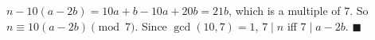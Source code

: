 $n-10(a-2b)=10a+b-10a+20b=21b$, which is a multiple of $7$. So $n\equiv10(a-2b)\pmod7$. Since $\gcd(10,7)=1$, $7\mid n$ iff $7\mid a-2b$. $\blacksquare$
